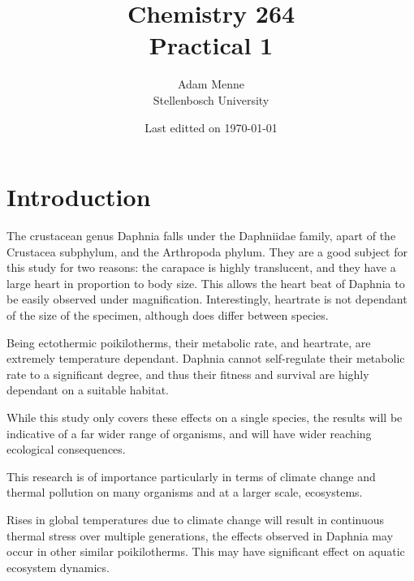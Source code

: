 \documentclass[a4paper, british]{article}
\title{Chemistry 264\\ Practical 1}
\date{Last editted on \today}
\author{Adam Menne\\ Stellenbosch University}
\begin{document}
\maketitle



\section{Introduction}

The crustacean genus Daphnia falls under the Daphniidae family, apart of the Crustacea subphylum, and the Arthropoda phylum. They are a good subject for this study for two reasons: the carapace is highly translucent, and they have a large heart in proportion to body size. This allows the heart beat of Daphnia to be easily observed under magnification. Interestingly, heartrate is not dependant of the size of the specimen, although does differ between species.\cite{santosoCardiovascularPerformanceMeasurement2020}

Being ectothermic poikilotherms, their metabolic rate, and heartrate, are extremely temperature dependant. Daphnia cannot self-regulate their metabolic rate to a significant degree, and thus their fitness and survival are highly dependant on a suitable habitat.

\newpage

While this study only covers these effects on a single species, the results will be indicative of a far wider range of organisms, and will have wider reaching ecological consequences.

This research is of importance particularly in terms of climate change and thermal pollution on many organisms and at a larger scale, ecosystems.

Rises in global temperatures due to climate change will result in continuous thermal stress over multiple generations, the effects observed in Daphnia may occur in other similar poikilotherms.
This may have significant effect on aquatic ecosystem dynamics.\cite{khanEffectTemperatureWaterflea2008}
\end{document}
